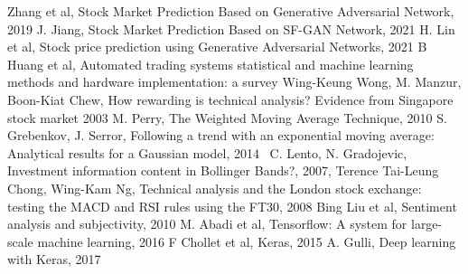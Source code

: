 \documentclass[11pt]{article} %
\begin{document}
\begin{thebibliography}{9}
Zhang et al, Stock Market Prediction Based on Generative Adversarial Network, 2019
J. Jiang, Stock Market Prediction Based on SF-GAN Network, 2021
H. Lin et al, Stock price prediction using Generative Adversarial Networks, 2021
B Huang et al, Automated trading systems statistical and machine learning methods and hardware implementation: a survey
Wing-Keung Wong, M. Manzur, Boon-Kiat Chew, How rewarding is technical analysis? Evidence from Singapore stock market 2003
M. Perry, The Weighted Moving Average Technique, 2010
S. Grebenkov, J. Serror, Following a trend with an exponential moving average: Analytical results for a Gaussian model, 2014\
C. Lento, N. Gradojevic, Investment information content in Bollinger Bands?, 2007, 
\bibitem{macd}
Terence Tai-Leung Chong, Wing-Kam Ng, Technical analysis and the London stock exchange: testing the MACD and RSI rules using the FT30, 2008
\bibitem{sentiment}
Bing Liu et al,  Sentiment analysis and subjectivity, 2010
M. Abadi et al, Tensorflow: A system for large-scale machine learning, 2016
\bibitem{keras}
F Chollet et al, Keras, 2015
A. Gulli,  Deep learning with Keras, 2017
\end{thebibliography}
\end{document}
